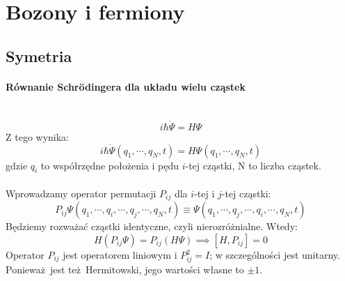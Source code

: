 \section{Bozony i fermiony}
\subsection{Symetria}
\paragraph*{Równanie Schrödingera dla układu wielu cząstek}\mbox{}\\
%
\begin{equation*}
    i \hbar \dot{\Psi} = H \Psi
\end{equation*}
%
Z tego wynika: 
%
\begin{equation*}
    i \hbar \dot{\Psi}(q_1, \cdots, q_N, t) = H \Psi(q_1, \cdots, q_N, t)
\end{equation*}
%
gdzie $q_i$ to współrzędne położenia i pędu $i$-tej cząstki, N to liczba cząstek.
%
\\ \\
%
Wprowadzamy operator permutacji $P_{ij}$ dla $i$-tej i $j$-tej cząstki:
%
\begin{equation*}
    P_{ij} \Psi(q_1, \cdots, q_i, \cdots, q_j, \cdots, q_N, t) \equiv \Psi(q_1, \cdots, q_j, \cdots, q_i, \cdots, q_N, t)
\end{equation*}
%
Będziemy rozważać cząstki identyczne, czyli nierozróżnialne. Wtedy:
%
\begin{equation*}
    H(P_{ij}\Psi) = P_{ij} (H \Psi) \implies [H, P_{ij}] = 0
\end{equation*}
%
%
Operator $P_{ij}$ jest operatorem liniowym i $P_{ij}^2 = I$; w szczególności
jest unitarny. Ponieważ jest też Hermitowski, jego wartości własne to $\pm 1$.
%
